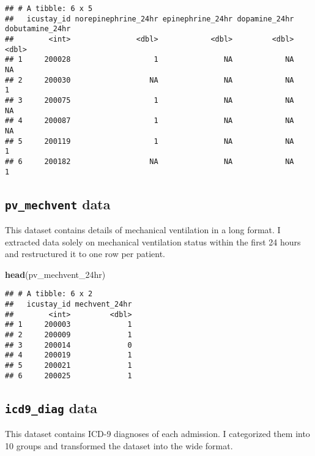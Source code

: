 \documentclass[
]{article}
\newenvironment{Shaded}{\begin{snugshade}}{\end{snugshade}}
\newcommand{\FunctionTok}[1]{\textcolor[rgb]{0.13,0.29,0.53}{\textbf{#1}}}
\newcommand{\NormalTok}[1]{#1}
\begin{document}
\begin{verbatim}
## # A tibble: 6 x 5
##   icustay_id norepinephrine_24hr epinephrine_24hr dopamine_24hr dobutamine_24hr
##        <int>               <dbl>            <dbl>         <dbl>           <dbl>
## 1     200028                   1               NA            NA              NA
## 2     200030                  NA               NA            NA               1
## 3     200075                   1               NA            NA              NA
## 4     200087                   1               NA            NA              NA
## 5     200119                   1               NA            NA               1
## 6     200182                  NA               NA            NA               1
\end{verbatim}

\hypertarget{pv_mechvent-data}{%
\subsection{\texorpdfstring{\texttt{pv\_mechvent}
data}{pv\_mechvent data}}\label{pv_mechvent-data}}

This dataset contains details of mechanical ventilation in a long
format. I extracted data solely on mechanical ventilation status within
the first 24 hours and restructured it to one row per patient.

\begin{Shaded}
\begin{Highlighting}[]
\FunctionTok{head}\NormalTok{(pv\_mechvent\_24hr)}
\end{Highlighting}
\end{Shaded}

\begin{verbatim}
## # A tibble: 6 x 2
##   icustay_id mechvent_24hr
##        <int>         <dbl>
## 1     200003             1
## 2     200009             1
## 3     200014             0
## 4     200019             1
## 5     200021             1
## 6     200025             1
\end{verbatim}

\hypertarget{icd9_diag-data}{%
\subsection{\texorpdfstring{\texttt{icd9\_diag}
data}{icd9\_diag data}}\label{icd9_diag-data}}

This dataset contains ICD-9 diagnoses of each admission. I categorized
them into 10 groups and transformed the dataset into the wide format.
\end{document}
